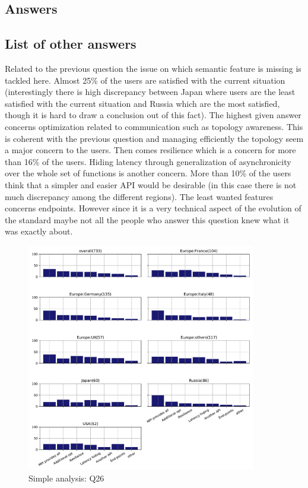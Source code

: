 
\subsection{Answers}


\subsection{List of other answers}
\begin{itemize}

\end{itemize}

Related to the previous question the issue on which semantic feature is missing is tackled here. Almost 25\% of the
users are satisfied with the current situation (interestingly there is high
discrepancy between Japan where users are the least satisfied with the current
situation and Russia which are the most satisfied, though it is hard to draw a
conclusion out of this fact). The highest given answer
concerns optimization related to communication such as topology awareness. This
is coherent with the previous question and managing efficiently the topology seem
a major concern to the users. Then comes resilience which is a concern for more
than 16\% of the users. Hiding latency through generalization of asynchronicity
over the whole set of functions is another concern. More than 10\% of the
users think that a simpler and easier API would be desirable (in this case there
is not much discrepancy among the different regions).  The least wanted features
concerns endpoints. However since it is a very technical aspect of the evolution
of the standard maybe not all the people who answer this question knew what it was exactly about.  

\begin{figure}[htb]
\begin{center}
\includegraphics[width=10cm]{../pdfs/Q26.pdf}
\caption{Simple analysis: Q26}
\label{fig:Q26}
\end{center}
\end{figure}
